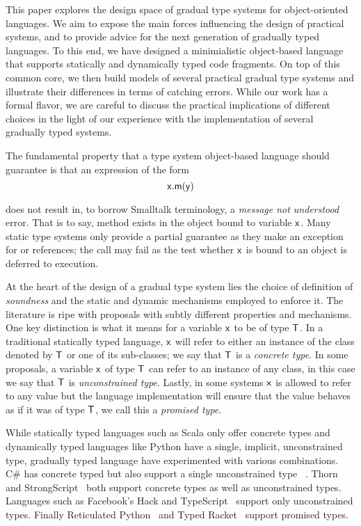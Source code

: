 \documentclass[preprint]{sigplanconf}
\newcommand{\x}{\M{\xt{x}}}
\newcommand{\T}{\M{\xt T}}
\newcommand{\M}[1]{\ensuremath{#1}\xspace}
\newcommand{\xt}[1]{{\sf{#1}}\xspace}
\begin{document}
This paper explores the design space of gradual type systems for
object-oriented languages. We aim to expose the main forces influencing the
design of practical systems, and to provide advice for the next generation
of gradually typed languages. To this end, we have designed a minimialistic
object-based language that supports statically and dynamically typed code
fragments. On top of this common core, we then build models of several
practical gradual type systems and illustrate their differences in terms of
catching errors. While our work has a formal flavor, we are careful to
discuss the practical implications of different choices in the light of
our experience with the implementation of several gradually typed systems.

The fundamental property that a type system object-based language should
guarantee is that an expression of the form 
\vspace{-1mm}\[ \xt{x.m(y)} \]

\vspace{-1mm}\noindent does not result in, to borrow Smalltalk terminology,
a \emph{message not understood} error.  That is to say, method \xt{m} exists
in the object bound to variable \x. Many static type systems only
provide a partial guarantee as they make an exception for \xt{null} or
\xt{undefined} references; the call may fail as the test whether \x is
bound to an object is deferred to execution.

At the heart of the design of a gradual type system lies the choice of
definition of \emph{soundness} and the static and dynamic mechanisms
employed to enforce it. The literature is ripe with proposals with subtly
different properties and mechanisms.  One key distinction is what it means
for a variable \x to be of type \T. In a traditional statically typed
language, \x will refer to either an instance of the class denoted by \T or
one of its sub-classes; we say that \T is a \emph{concrete type}. In some
proposals, a variable \x of type \T can refer to an instance of any class,
in this case we say that \T is \emph{unconstrained type}. Lastly, in some
systems \x is allowed to refer to any value but the language implementation
will ensure that the value behaves as if it was of type \T, we call this a
\emph{promised type}.

While statically typed languages such as Scala only offer concrete types and
dynamically typed languages like Python have a single, implicit,
unconstrained type, gradually typed language have experimented with various
combinations.  C\# has concrete typed but also support a single
unconstrained type \xt{dyn}~\cite{Bierman10}. Thorn~\cite{popl10} and
StrongScript~\cite{ecoop15} both support concrete types as well as
unconstrained types. Languages such as Facebook's Hack and
TypeScript~\cite{typescript13} support only unconstrained types.  Finally
Reticulated Python~\cite{siek14} and Typed Racket~\cite{tf-dls06} support
promised types.
\end{document}
